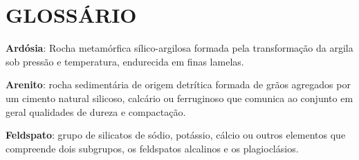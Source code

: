 






\chapter*{GLOSSÁRIO}

{ \setlength{\parindent}{0pt} %

\textbf{Ardósia}: Rocha metamórfica sílico-argilosa formada pela transformação da argila sob pressão e temperatura, endurecida em finas lamelas.

\textbf{Arenito}: rocha sedimentária de origem detrítica formada de grãos agregados por um cimento natural silicoso, calcário ou ferruginoso que comunica ao conjunto em geral qualidades de dureza e compactação.

\textbf{Feldspato}: grupo de silicatos de sódio, potássio, cálcio ou outros elementos que compreende dois subgrupos, os feldspatos alcalinos e os plagioclásios.






} %


